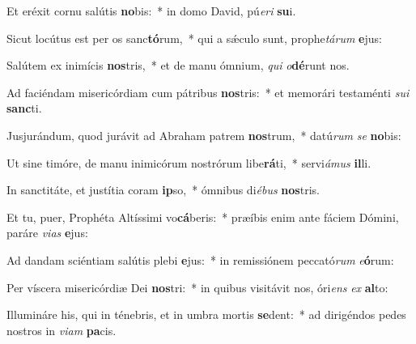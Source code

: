 \item Et eréxit cornu salútis \textbf{no}bis:~* in domo David, pú\textit{e}\textit{ri} \textbf{su}i.
\item Sicut locútus est per os sanc\textbf{tó}rum,~* qui a sǽculo sunt, prophe\textit{tá}\textit{rum} \textbf{e}jus:
\item Salútem ex inimícis \textbf{nos}tris,~* et de manu ómnium, \textit{qui} \textit{o}\textbf{dé}runt nos.
\item Ad faciéndam misericórdiam cum pátribus \textbf{nos}tris:~* et memorári testaménti \textit{su}\textit{i} \textbf{sanc}ti.
\item Jusjurándum, quod jurávit ad Abraham patrem \textbf{nos}trum,~* datú\textit{rum} \textit{se} \textbf{no}bis:
\item Ut sine timóre, de manu inimicórum nostrórum libe\textbf{rá}ti,~* servi\textit{á}\textit{mus} \textbf{il}li.
\item In sanctitáte, et justítia coram \textbf{ip}so,~* ómnibus di\textit{é}\textit{bus} \textbf{nos}tris.
\item Et tu, puer, Prophéta Altíssimi vo\textbf{cá}beris:~* præíbis enim ante fáciem Dómini, paráre \textit{vi}\textit{as} \textbf{e}jus:
\item Ad dandam sciéntiam salútis plebi \textbf{e}jus:~* in remissiónem peccató\textit{rum} \textit{e}\textbf{ó}rum:
\item Per víscera misericórdiæ Dei \textbf{nos}tri:~* in quibus visitávit nos, óri\textit{ens} \textit{ex} \textbf{al}to:
\item Illumináre his, qui in ténebris, et in umbra mortis \textbf{se}dent:~* ad dirigéndos pedes nostros in \textit{vi}\textit{am} \textbf{pa}cis.
